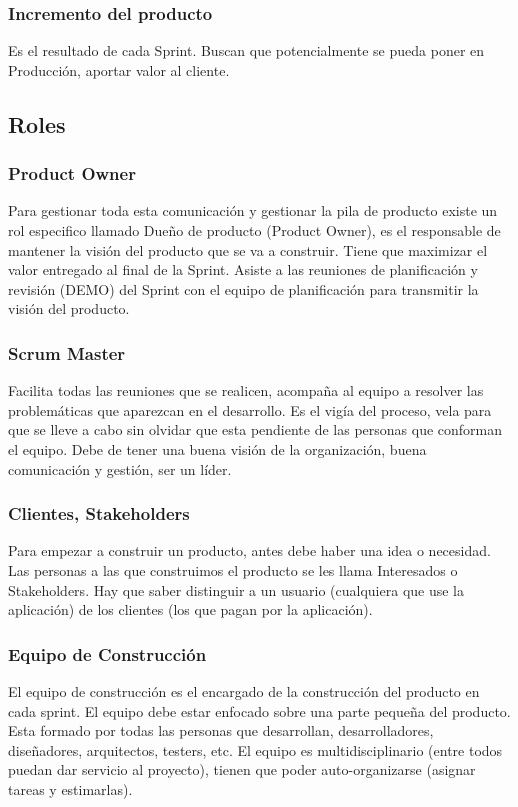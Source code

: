 \documentclass[titlepage,a4paper]{article}
\begin{document}
\subsubsection*{Incremento del producto}
Es el resultado de cada Sprint. Buscan que potencialmente se pueda poner en Producción, aportar valor al cliente.

\subsection{Roles}
\subsubsection*{Product Owner}
Para gestionar toda esta comunicación y gestionar la pila de producto existe un rol especifico llamado Dueño de producto (Product Owner), es el responsable de mantener la visión del producto que se va a construir. Tiene que maximizar el valor entregado al final de la Sprint. Asiste a las reuniones de planificación y revisión (DEMO) del Sprint con el equipo de planificación para transmitir la visión del producto.

\subsubsection*{Scrum Master}
Facilita todas las reuniones que se realicen, acompaña al equipo a resolver las problemáticas que aparezcan en el desarrollo. Es el vigía del proceso, vela para que se lleve a cabo sin olvidar que esta pendiente de las personas que conforman el equipo. Debe de tener una buena visión de la organización, buena comunicación y gestión, ser un líder.

\subsubsection*{Clientes, Stakeholders}
Para empezar a construir un producto, antes debe haber una idea o necesidad. Las personas a las que construimos el producto se les llama Interesados o Stakeholders. Hay que saber distinguir a un usuario (cualquiera que use la aplicación) de los clientes (los que pagan por la aplicación).

\subsubsection*{Equipo de Construcción}
El equipo de construcción es el encargado de la construcción del producto en cada sprint. El equipo debe estar enfocado sobre una parte pequeña del producto. Esta formado por todas las personas que desarrollan, desarrolladores, diseñadores, arquitectos, testers, etc. El equipo es multidisciplinario (entre todos puedan dar servicio al proyecto), tienen que poder auto-organizarse (asignar tareas y estimarlas).
\end{document}

